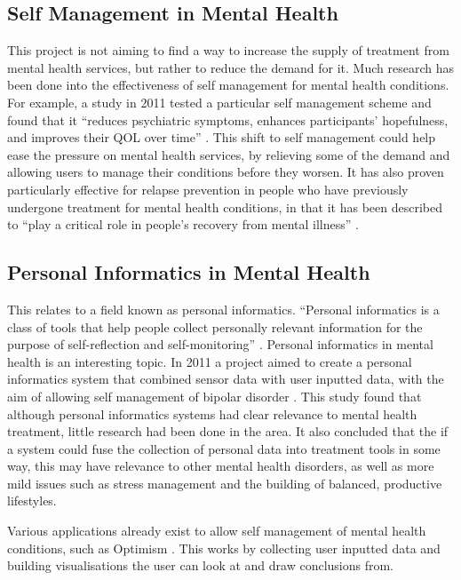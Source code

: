 \documentclass[11pt,openright,a4paper]{report}
\begin{document}
\subsection{Self Management in Mental Health}
This project is not aiming to find a way to increase the supply of treatment from mental health services, but rather to reduce the demand for it. Much research has been done into the effectiveness of self management for mental health conditions. For example, a study in 2011 tested a particular self management scheme and found that it \enquote{reduces psychiatric symptoms, enhances participants’ hopefulness, and improves their QOL over time} \parencite{wrapstudy}. This shift to self management could help ease the pressure on mental health services, by relieving some of the demand and allowing users to manage their conditions before they worsen. It has also proven particularly effective for relapse prevention in people who have previously undergone treatment for mental health conditions, in that it has been described to \enquote{play a critical role in people's recovery from mental illness} \parencite{selfmanagementrelapse}.

\subsection{Personal Informatics in Mental Health}
This relates to a field known as personal informatics. \enquote{Personal informatics is a class of tools that help people collect personally relevant information for the purpose of self-reflection and self-monitoring} \parencite{personalinformatics}. Personal informatics in mental health is an interesting topic. In 2011 a project aimed to create a personal informatics system that combined sensor data with user inputted data, with the aim of allowing self management of bipolar disorder \parencite{pimentalhealth}. This study found that although personal informatics systems had clear relevance to mental health treatment, little research had been done in the area. It also concluded that the if a system could fuse the collection of personal data into treatment tools in some way, this may have relevance to other mental health disorders, as well as more mild issues such as stress management and the building of balanced, productive lifestyles.

Various applications already exist to allow self management of mental health conditions, such as Optimism \parencite{optimism}. This works by collecting user inputted data and building visualisations the user can look at and draw conclusions from.
\end{document}

